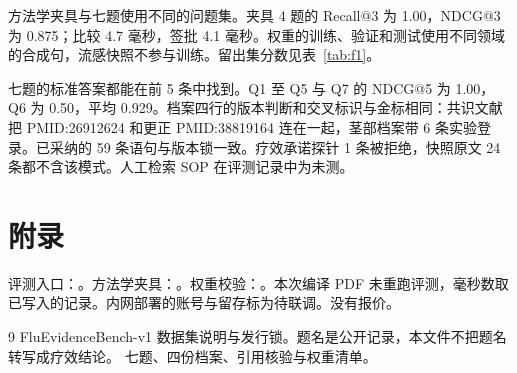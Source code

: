 方法学夹具与七题使用不同的问题集。夹具 4 题的 Recall@3 为 1.00，NDCG@3 为 0.875；比较 4.7 毫秒，签批 4.1 毫秒。权重的训练、验证和测试使用不同领域的合成句，流感快照不参与训练。留出集分数见表~\ref{tab:f1}。

七题的标准答案都能在前 5 条中找到。Q1 至 Q5 与 Q7 的 NDCG@5 为 1.00，Q6 为 0.50，平均 0.929。档案四行的版本判断和交叉标识与金标相同：共识文献把 PMID:26912624 和更正 PMID:38819164 连在一起，茎部档案带 6 条实验登录。已采纳的 59 条语句与版本锁一致。疗效承诺探针 1 条被拒绝，快照原文 24 条都不含该模式。人工检索 SOP 在评测记录中为未测。

\clearpage
\section{附录}
评测入口：。方法学夹具：。权重校验：。本次编译 PDF 未重跑评测，毫秒数取已写入的记录。内网部署的账号与留存标为待联调。没有报价。

\begin{thebibliography}{9}
 FluEvidenceBench-v1 数据集说明与发行锁。题名是公开记录，本文件不把题名转写成疗效结论。
 七题、四份档案、引用核验与权重清单。
\end{thebibliography}


